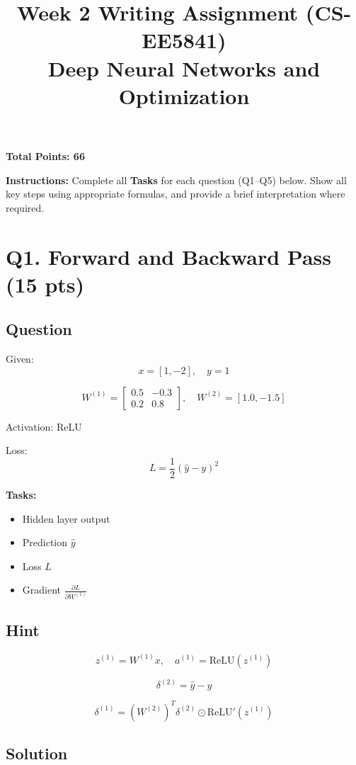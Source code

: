 \documentclass[11pt]{article}
\title{\textbf{Week 2 Writing Assignment (CS-EE5841)}\\Deep Neural Networks and Optimization}
\author{}
\date{}
\begin{document}
\maketitle

\noindent \textbf{Total Points: 66}

\vspace{0.3cm}

\noindent \textbf{Instructions:} Complete all \textbf{Tasks} for each question (Q1--Q5) below. Show all key steps using appropriate formulas, and provide a brief interpretation where required.

\section*{Q1. Forward and Backward Pass (15 pts)}

\subsection*{Question}

Given:
\[
x=[1,-2], \quad y=1
\]

\[
W^{(1)}=
\begin{bmatrix}
0.5 & -0.3\\
0.2 & 0.8
\end{bmatrix},
\quad
W^{(2)}=[1.0,-1.5]
\]

Activation: ReLU

Loss:
\[
L=\frac{1}{2}(\hat{y}-y)^2
\]

\textbf{Tasks:}
\begin{itemize}
    \item Hidden layer output
    \item Prediction $\hat{y}$
    \item Loss $L$
    \item Gradient $\frac{\partial L}{\partial W^{(1)}}$
\end{itemize}

\subsection*{Hint}

\[
z^{(1)}=W^{(1)}x, \quad a^{(1)}=\text{ReLU}(z^{(1)})
\]

\[
\delta^{(2)}=\hat{y}-y
\]

\[
\delta^{(1)}=(W^{(2)})^T\delta^{(2)}\odot \text{ReLU}'(z^{(1)})
\]

\subsection*{Solution}
\end{document}
